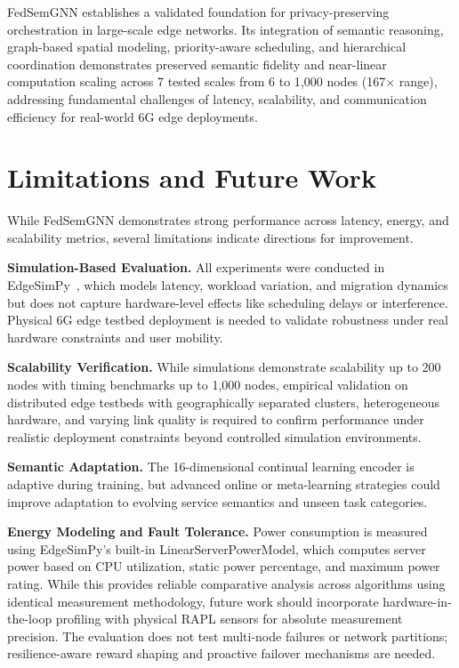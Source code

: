 \documentclass[conference]{IEEEtran}
\begin{document}
	FedSemGNN establishes a validated foundation for privacy-preserving orchestration in large-scale edge networks. Its integration of semantic reasoning, graph-based spatial modeling, priority-aware scheduling, and hierarchical coordination demonstrates preserved semantic fidelity and near-linear computation scaling across 7 tested scales from 6 to 1{,}000 nodes (167$\times$ range), addressing fundamental challenges of latency, scalability, and communication efficiency for real-world 6G edge deployments.
	
	
	\section{Limitations and Future Work}
	\label{sec:limitations_future}
	
	While FedSemGNN demonstrates strong performance across latency, energy, and scalability metrics, several limitations indicate directions for improvement.
	
	\textbf{Simulation-Based Evaluation.} All experiments were conducted in EdgeSimPy~\cite{souza2023edgesimpy}, which models latency, workload variation, and migration dynamics but does not capture hardware-level effects like scheduling delays or interference. Physical 6G edge testbed deployment is needed to validate robustness under real hardware constraints and user mobility.
	
	\textbf{Scalability Verification.} While simulations demonstrate scalability up to 200 nodes with timing benchmarks up to 1{,}000 nodes, empirical validation on distributed edge testbeds with geographically separated clusters, heterogeneous hardware, and varying link quality is required to confirm performance under realistic deployment constraints beyond controlled simulation environments.
	
	\textbf{Semantic Adaptation.} The 16-dimensional continual learning encoder is adaptive during training, but advanced online or meta-learning strategies could improve adaptation to evolving service semantics and unseen task categories.
	
	\textbf{Energy Modeling and Fault Tolerance.} Power consumption is measured using EdgeSimPy's built-in LinearServerPowerModel, which computes server power based on CPU utilization, static power percentage, and maximum power rating. While this provides reliable comparative analysis across algorithms using identical measurement methodology, future work should incorporate hardware-in-the-loop profiling with physical RAPL sensors for absolute measurement precision. The evaluation does not test multi-node failures or network partitions; resilience-aware reward shaping and proactive failover mechanisms are needed.
	
\end{document}
